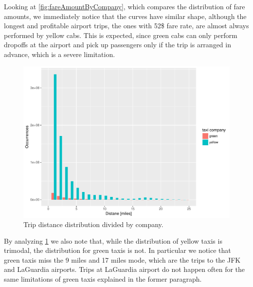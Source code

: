 \documentclass{acm_proc_article-sp-sigmod09}
\begin{document}
Looking at \cref{fig:fareAmountByCompany}, which compares the distribution of fare amounts, we immediately notice that the curves have similar shape, although the longest and profitable airport trips, the ones with 52\$ fare rate, are almost always performed by yellow cabs. This is expected, since green cabs can only perform dropoffs at the airport and pick up passengers only if the trip is arranged in advance, which is a severe limitation.

\begin{figure}
	\centering
	\includegraphics[width=1\columnwidth]{resources/base_plots/trip_distance_by_company_distr.pdf}
	\caption{Trip distance distribution divided by company.}
	\label{fig:tripDistanceByCompany}
\end{figure}

By analyzing \cref{fig:tripDistanceByCompany} we also note that, while the distribution of yellow taxis is trimodal, the distribution for green taxis is not. In particular we notice that green taxis miss the 9 miles and 17 miles mode, which are the trips to the JFK and LaGuardia airports. Trips at LaGuardia airport do not happen often for the same limitations of green taxis explained in the former paragraph.
\end{document}
